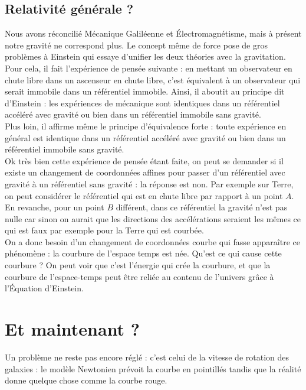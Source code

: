 \documentclass{classe}
\begin{document}
\subsection{Relativité générale ?}

Nous avons réconcilié Mécanique Galiléenne et Électromagnétisme, mais à présent notre gravité ne correspond plus. Le concept même de force pose de gros problèmes à Einstein qui essaye d'unifier les deux théories avec la gravitation. Pour cela, il fait l'expérience de pensée suivante : en mettant un observateur en chute libre dans un ascenseur en chute libre, c'est équivalent à un observateur qui serait immobile dans un référentiel immobile. Ainsi, il aboutit au principe dit d'Einstein : les expériences de mécanique sont identiques dans un référentiel accéléré avec gravité ou bien dans un référentiel immobile sans gravité.\\

Plus loin, il affirme même le principe d'équivalence forte : toute expérience en général est identique dans un référentiel accéléré avec gravité ou bien dans un référentiel immobile sans gravité.\\

Ok très bien cette expérience de pensée étant faite, on peut se demander si il existe un changement de coordonnées affines pour passer d'un référentiel avec gravité à un référentiel sans gravité : la réponse est non. Par exemple sur Terre, on peut considérer le référentiel qui est en chute libre par rapport à un point $A$. En revanche, pour un point $B$ différent, dans ce référentiel la gravité n'est pas nulle car sinon on aurait que les directions des accélérations seraient les mêmes ce qui est faux par exemple pour la Terre qui est courbée.\\

On a donc besoin d'un changement de coordonnées courbe qui fasse apparaître ce phénomène : la courbure de l'espace temps est née. Qu'est ce qui cause cette courbure ? On peut voir que c'est l'énergie qui crée la courbure, et que la courbure de l'espace-temps peut être reliée au contenu de l'univers grâce à l'Équation d'Einstein.

\section{Et maintenant ?}

Un problème ne reste pas encore réglé : c'est celui de la vitesse de rotation des galaxies : le modèle Newtonien prévoit la courbe en pointillés tandis que la réalité donne quelque chose comme la courbe rouge.
\end{document}
